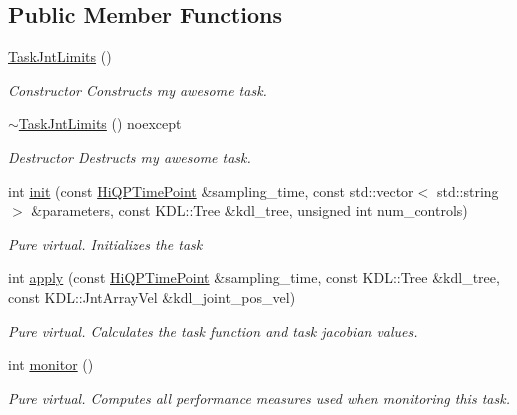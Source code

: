 \subsection*{Public Member Functions}
\begin{DoxyCompactItemize}
\item 
\hypertarget{classhiqp_1_1TaskJntLimits_a82d969e4fafcdd5a0830700ef1b67204}{\hyperlink{classhiqp_1_1TaskJntLimits_a82d969e4fafcdd5a0830700ef1b67204}{Task\-Jnt\-Limits} ()}\label{classhiqp_1_1TaskJntLimits_a82d969e4fafcdd5a0830700ef1b67204}

\begin{DoxyCompactList}\small\item\em Constructor Constructs my awesome task. \end{DoxyCompactList}\item 
\hypertarget{classhiqp_1_1TaskJntLimits_af6d3deb66428b31eada36154640134c0}{\hyperlink{classhiqp_1_1TaskJntLimits_af6d3deb66428b31eada36154640134c0}{$\sim$\-Task\-Jnt\-Limits} () noexcept}\label{classhiqp_1_1TaskJntLimits_af6d3deb66428b31eada36154640134c0}

\begin{DoxyCompactList}\small\item\em Destructor Destructs my awesome task. \end{DoxyCompactList}\item 
int \hyperlink{classhiqp_1_1TaskJntLimits_a9b5ae3ada59d143d57d8abd12c8e1e5f}{init} (const \hyperlink{classhiqp_1_1HiQPTimePoint}{Hi\-Q\-P\-Time\-Point} \&sampling\-\_\-time, const std\-::vector$<$ std\-::string $>$ \&parameters, const K\-D\-L\-::\-Tree \&kdl\-\_\-tree, unsigned int num\-\_\-controls)
\begin{DoxyCompactList}\small\item\em {\itshape Pure virtual}. Initializes the task \end{DoxyCompactList}\item 
int \hyperlink{classhiqp_1_1TaskJntLimits_aa140824f7bc5b80754f3b57b43d7aa69}{apply} (const \hyperlink{classhiqp_1_1HiQPTimePoint}{Hi\-Q\-P\-Time\-Point} \&sampling\-\_\-time, const K\-D\-L\-::\-Tree \&kdl\-\_\-tree, const K\-D\-L\-::\-Jnt\-Array\-Vel \&kdl\-\_\-joint\-\_\-pos\-\_\-vel)
\begin{DoxyCompactList}\small\item\em {\itshape Pure virtual}. Calculates the task function and task jacobian values. \end{DoxyCompactList}\item 
int \hyperlink{classhiqp_1_1TaskJntLimits_a1a2b92667aa173f74b2df4f1364ddcd9}{monitor} ()
\begin{DoxyCompactList}\small\item\em {\itshape Pure virtual}. Computes all performance measures used when monitoring this task. \end{DoxyCompactList}\end{DoxyCompactItemize}
